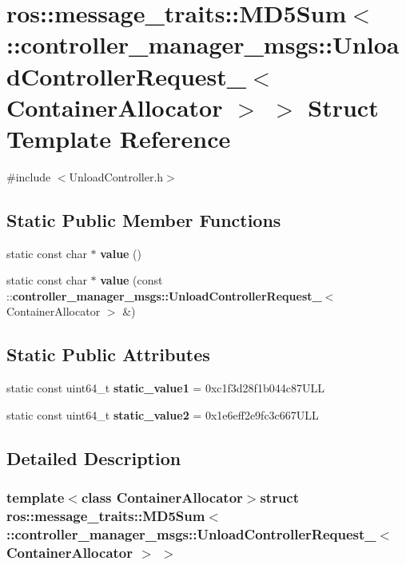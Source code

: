 \section{ros\-:\-:message\-\_\-traits\-:\-:\-M\-D5\-Sum$<$ \-:\-:controller\-\_\-manager\-\_\-msgs\-:\-:\-Unload\-Controller\-Request\-\_\-$<$ \-Container\-Allocator $>$ $>$ \-Struct \-Template \-Reference}
\label{structros_1_1message__traits_1_1MD5Sum_3_01_1_1controller__manager__msgs_1_1UnloadControllerRequ4afc64b6742d62450c8c4257a4394bbb}


{\ttfamily \#include $<$\-Unload\-Controller.\-h$>$}

\subsection*{\-Static \-Public \-Member \-Functions}
\begin{DoxyCompactItemize}
\item 
static const char $\ast$ {\bf value} ()
\item 
static const char $\ast$ {\bf value} (const \-::{\bf controller\-\_\-manager\-\_\-msgs\-::\-Unload\-Controller\-Request\-\_\-}$<$ \-Container\-Allocator $>$ \&)
\end{DoxyCompactItemize}
\subsection*{\-Static \-Public \-Attributes}
\begin{DoxyCompactItemize}
\item 
static const uint64\-\_\-t {\bf static\-\_\-value1} = 0xc1f3d28f1b044c87\-U\-L\-L
\item 
static const uint64\-\_\-t {\bf static\-\_\-value2} = 0x1e6eff2e9fc3c667\-U\-L\-L
\end{DoxyCompactItemize}


\subsection{\-Detailed \-Description}
\subsubsection*{template$<$class Container\-Allocator$>$struct ros\-::message\-\_\-traits\-::\-M\-D5\-Sum$<$ \-::controller\-\_\-manager\-\_\-msgs\-::\-Unload\-Controller\-Request\-\_\-$<$ Container\-Allocator $>$ $>$}



